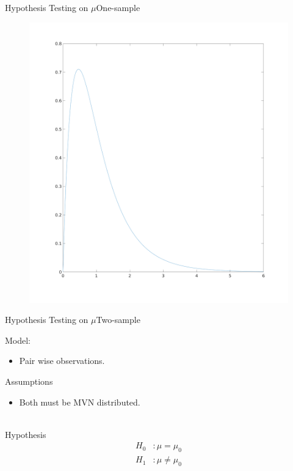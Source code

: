 \documentclass[aspectratio=169,10pt,t]{beamer}
\begin{document}
\begin{frame}{Hypothesis Testing on $\mu$}{One-sample}
    \begin{figure}[H]
        \centering
        \includegraphics[scale=0.15]{images/f.png}
    \end{figure} 
\end{frame}

\begin{frame}{Hypothesis Testing on $\mu$}{Two-sample}

    Model:
    \begin{itemize}
        \item Pair wise observations.
    \end{itemize}


   Assumptions 
   \begin{itemize}
       \item Both must be MVN distributed.
   \end{itemize}
   \\


   Hypothesis
    \begin{align*}
        H_0&: \mu = \mu_0\\
        H_1&: \mu \neq \mu_0
    \end{align*}
    
\end{frame}
\end{document}
